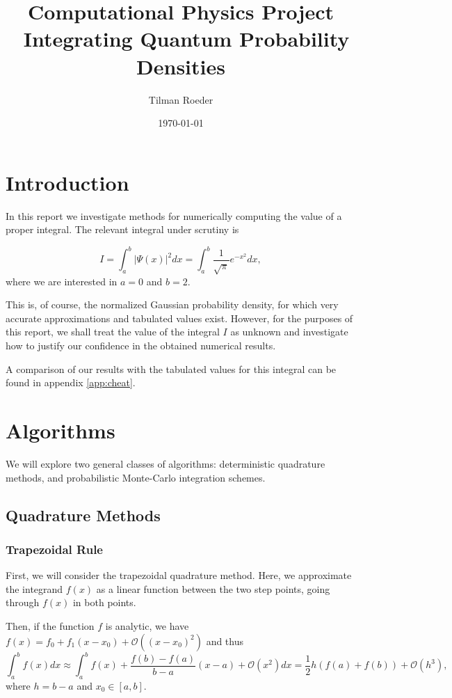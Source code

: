 \documentclass[10pt, a4paper]{article}
\title{Computational Physics Project \\ Integrating Quantum Probability Densities}
\author{Tilman Roeder}
\date{\today}
\begin{document}
\maketitle

\section{Introduction}
In this report we investigate methods for numerically computing the value of a proper integral.
The relevant integral under scrutiny is

\begin{equation}
\label{eq:target}
I = \int_a^b |\Psi(x)|^2 dx = \int_a^b \frac{1}{\sqrt{\pi}} e^{-x^2} dx,
\end{equation}
where we are interested in $a = 0$ and $b = 2$.

This is, of course, the normalized Gaussian probability density, for which
very accurate approximations and tabulated values exist. However, for the purposes of this report, we shall
treat the value of the integral $I$ as unknown and investigate how to justify our confidence in the
obtained numerical results.

A comparison of our results with the tabulated values for this integral can be found in appendix
\ref{app:cheat}.

\section{Algorithms}
We will explore two general classes of algorithms: deterministic quadrature methods, and probabilistic
Monte-Carlo integration schemes.

\subsection{Quadrature Methods}
  \subsubsection{Trapezoidal Rule}
  \label{sec:trap}
  First, we will consider the trapezoidal quadrature method. Here, we approximate the integrand $f(x)$
  as a linear function between the two step points, going through $f(x)$ in both points.

  Then, if the function $f$ is analytic, we have $f(x) = f_0 + f_1 (x-x_0) + \mathcal{O}((x-x_0)^2)$\footnotemark
  and thus
  \begin{equation}
  \int_a^b f(x) dx \approx
  \int_a^b f(x) + \frac{f(b) - f(a)}{b-a} (x-a) + \mathcal{O}(x^2) dx =
  \frac{1}{2} h (f(a) + f(b)) + \mathcal{O}(h^3),
  \end{equation}
  where $h = b-a$ and $x_0 \in [a,b]$.
\end{document}
